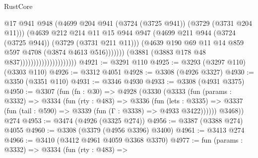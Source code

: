 \begin{lexlean}{RustCore}
\begin{coremodule}
                                                  @17
                                                  @941
                                                  @948
                                                  (@4699
                                                    @204
                                                    @941
                                                    (@3724 (@3725 @941))
                                                    (@3729 (@3731 @204 @11)))
                                                  (@4639
                                                    @212
                                                    @214
                                                    @11
                                                    @15
                                                    @944
                                                    @947
                                                    (@4699
                                                      @211
                                                      @944
                                                      (@3724 (@3725 @944))
                                                      (@3729 (@3731 @211 @11)))
                                                    (@4639
                                                      @190
                                                      @69
                                                      @11
                                                      @14
                                                      @859
                                                      @597
                                                      @4708
                                                      (@3874 @4613 @516)))))))
                                          (@3881 (@3883 @178 @48 @837)))))))))))))))))))))
@4921 := @3291 @110
@4925 := @3293 (@3297 @110) (@3303 @110)
@4926 := @3312 @4051
@4928 := @3308 (@4926 @3327)
@4930 := @3350 (@3351 @110)
@4931 := @3346 @4930
@4933 := @3308 (@4931 @3375)
@4950 := @3307
    (fun (fn : @30) =>
    @4928
      (@3330
        (@3333
          (fun (params : @3332) =>
          @3334
            (fun (rty : @483) =>
            @3336
              (fun (lets : @3335) =>
              @3337 (fun (tail : @590) => @3339 (fun (Γ : @3338) => @4933 @3422))))))
        @3468))
    @274
@4953 := @3474 (@4926 (@3325 @274))
@4956 := @3387 (@3388 @274) @4055
@4960 := @3308 (@3379 (@4956 @3396) @3400)
@4961 := @3413 @274
@4966 := @3410 (@3412 @4961 @4059 @3368 @3370)
@4977 := fun (params : @3332) =>
  @3334
    (fun (rty : @483) =>

\end{coremodule}
\end{lexlean}
